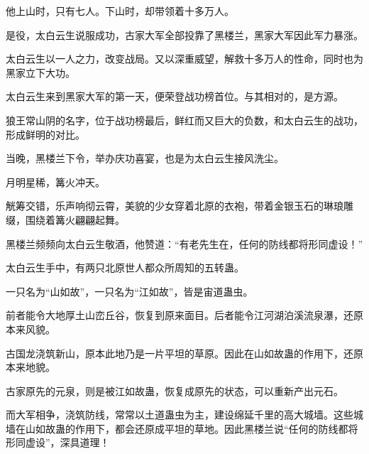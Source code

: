 \begin{this_body}
他上山时，只有七人。下山时，却带领着十多万人。

是役，太白云生说服成功，古家大军全部投靠了黑楼兰，黑家大军因此军力暴涨。

太白云生以一人之力，改变战局。又以深重威望，解救十多万人的性命，同时也为黑家立下大功。

太白云生来到黑家大军的第一天，便荣登战功榜首位。与其相对的，是方源。

狼王常山阴的名字，位于战功榜最后，鲜红而又巨大的负数，和太白云生的战功，形成鲜明的对比。

当晚，黑楼兰下令，举办庆功喜宴，也是为太白云生接风洗尘。

月明星稀，篝火冲天。

觥筹交错，乐声响彻云霄，美貌的少女穿着北原的衣袍，带着金银玉石的琳琅雕缀，围绕着篝火翩翩起舞。

黑楼兰频频向太白云生敬酒，他赞道：“有老先生在，任何的防线都将形同虚设！”

太白云生手中，有两只北原世人都众所周知的五转蛊。

一只名为“山如故”，一只名为“江如故”，皆是宙道蛊虫。

前者能令大地厚土山峦丘谷，恢复到原来面目。后者能令江河湖泊溪流泉瀑，还原本来风貌。

古国龙浇筑新山，原本此地乃是一片平坦的草原。因此在山如故蛊的作用下，还原本来地貌。

古家原先的元泉，则是被江如故蛊，恢复成原先的状态，可以重新产出元石。

而大军相争，浇筑防线，常常以土道蛊虫为主，建设绵延千里的高大城墙。这些城墙在山如故蛊的作用下，都会还原成平坦的草地。因此黑楼兰说“任何的防线都将形同虚设”，深具道理！

\end{this_body}

